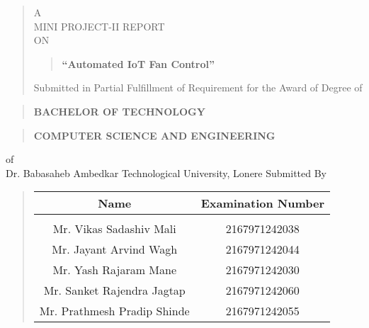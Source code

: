 \documentclass[12pt]{report}
\author{}
\date{}
\begin{document}
	\large
	\centering
	\begin{quote}
		\large
		\centering
		A\\MINI PROJECT-II REPORT\\ON
		
		\begin{quote}
			\centering
			
			\textbf{``Automated IoT Fan Control''}
		\end{quote}
		
		Submitted in Partial Fulfillment of Requirement for the Award of
		Degree of
	\end{quote}
	
	\begin{quote}
		\centering
		\large
		\textbf{BACHELOR OF TECHNOLOGY}
	\end{quote}
	
	\begin{quote}
		\large
		\centering
		\textbf{COMPUTER SCIENCE AND ENGINEERING}\\
	\end{quote}
	of\\
	Dr. Babasaheb Ambedkar Technological University, Lonere
	Submitted By
	\vspace{0.5cm}
	\begin{quote}
		\normalsize
		\centering
		\begin{table}[ht]
			\centering
			\begin{tabular}{ c  c }
				
				\bfseries
				Name & \bfseries Examination Number \\[1ex]
				\hline\\[1ex]
				
				\hspace {-7.4ex}Mr. Vikas Sadashiv Mali & 2167971242038\\[1ex]
				\hspace {-7ex}Mr. Jayant Arvind Wagh & 2167971242044\\[1ex]
				\hspace {-7.3ex}Mr. Yash Rajaram Mane & 2167971242030\\[1ex]
				\hspace {-3.7ex}Mr. Sanket Rajendra Jagtap & 2167971242060\\[1ex]
				\hspace {-2ex}Mr. Prathmesh Pradip Shinde & 2167971242055\\[1ex]
				
				
			\end{tabular}
		\end{table}
	\end{quote}
	
\end{document}
